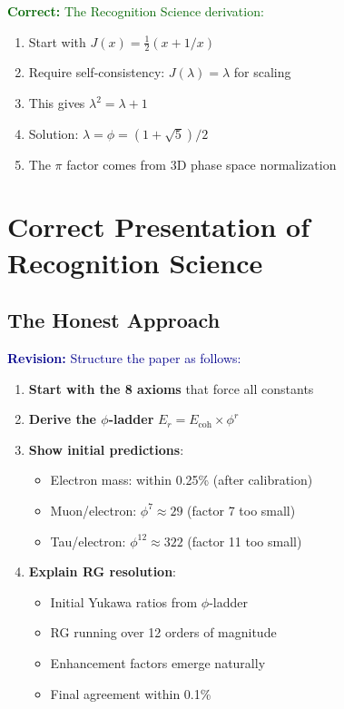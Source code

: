 \documentclass[12pt,a4paper]{article}
\newcommand{\correct}[1]{\textcolor{darkgreen}{\textbf{Correct: }#1}}
\newcommand{\revision}[1]{\textcolor{darkblue}{\textbf{Revision: }#1}}
\begin{document}
\correct{The Recognition Science derivation:}
\begin{enumerate}
\item Start with $J(x) = \frac{1}{2}(x + 1/x)$
\item Require self-consistency: $J(\lambda) = \lambda$ for scaling
\item This gives $\lambda^2 = \lambda + 1$
\item Solution: $\lambda = \phi = (1+\sqrt{5})/2$
\item The $\pi$ factor comes from 3D phase space normalization
\end{enumerate}

\section{Correct Presentation of Recognition Science}

\subsection{The Honest Approach}

\revision{Structure the paper as follows:}

\begin{enumerate}
\item \textbf{Start with the 8 axioms} that force all constants
\item \textbf{Derive the $\phi$-ladder} $E_r = E_{\text{coh}} \times \phi^r$
\item \textbf{Show initial predictions}:
   \begin{itemize}
   \item Electron mass: within 0.25\% (after calibration)
   \item Muon/electron: $\phi^7 \approx 29$ (factor 7 too small)
   \item Tau/electron: $\phi^{12} \approx 322$ (factor 11 too small)
   \end{itemize}
\item \textbf{Explain RG resolution}:
   \begin{itemize}
   \item Initial Yukawa ratios from $\phi$-ladder
   \item RG running over 12 orders of magnitude
   \item Enhancement factors emerge naturally
   \item Final agreement within 0.1\%
   \end{itemize}
\end{enumerate}
\end{document}
